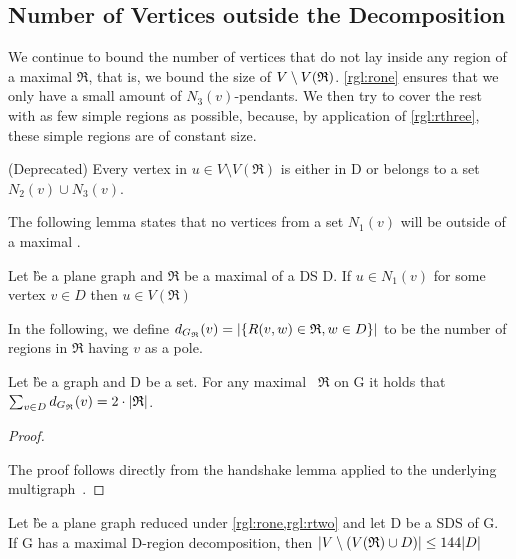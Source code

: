 




\subsection{Number of Vertices outside the Decomposition}
We continue to bound the number of vertices that do not lay inside any region of a maximal \dreg $\mathfrak{R}$, that is, we bound the size of $V \setminus {V(\mathfrak{R})} $. \cref{rgl:rone} ensures that we only have a small amount of $N_3(v)$-pendants. We then try to cover the rest with as few simple regions as possible, because, by application of \cref{rgl:rthree}, these simple regions are of constant size.


\begin{lemma}
    \cite{Alber2004}
    (Deprecated) Every vertex in $u \in V \setminus V(\mathfrak{R})$ is either in D or belongs to a set $N_2(v) \cup N_3(v)$.
\end{lemma}

The following lemma states that no vertices from a set $N_1(v)$ will be outside of a maximal \dreg.
\begin{lemma}\label{lemma:noneinside}
    \cite[Lemma 6]{Alber2004}
    Let \G be a plane graph and $\mathfrak{R}$ be a maximal \dreg of a DS D. If $u \in N_1(v)$ for some vertex $v \in D$ then $u \in V(\mathfrak{R})$

\end{lemma}
In the following, we define $d_{G_{\mathfrak{R}}}(v) = \abs{\{R(v,w) \in \mathfrak{R}, w \in D\}}$ to be the number of regions in $\mathfrak{R}$ having $v$ as a pole. 

\begin{corollary}
    Let \G be a graph and D be a set. For any maximal \dreg~$\mathfrak{R}$ on G it holds that $\sum_{v \in D} d_{G_{\mathfrak{R}}}(v) = 2 \cdot \abs{\mathfrak{R}}$.
\end{corollary}
\begin{proof}\label{lemma:polesBound}

    The proof follows directly from the handshake lemma applied to the underlying multigraph~\GR.
\end{proof}

\begin{proposition}
Let \G be a plane graph reduced under \cref*{rgl:rone,rgl:rtwo} and let D be a SDS of G. If G has a maximal D-region decomposition, then $\abs{V \setminus (V(\mathfrak{R}) \cup D)} \leq 144 \abs{D}$
\end{proposition}

